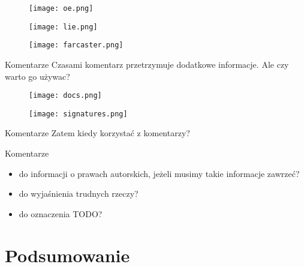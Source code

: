 \begin{frame}
	\begin{figure} \centering
		\texttt{[image: oe.png]}
	\end{figure}
\end{frame}

\begin{frame}
	\begin{figure} \centering
		\texttt{[image: lie.png]}
	\end{figure}
\end{frame}

\begin{frame}
	\begin{figure} \centering
		\texttt{[image: farcaster.png]}
	\end{figure}
\end{frame}

\begin{frame}{Komentarze}
	Czasami komentarz przetrzymuje dodatkowe informacje. Ale czy warto go używac?
\end{frame}

\begin{frame}
	\begin{figure} \centering
		\texttt{[image: docs.png]}
	\end{figure}
\end{frame}

\begin{frame}
	\begin{figure} \centering
		\texttt{[image: signatures.png]}
	\end{figure}
\end{frame}

\begin{frame}{Komentarze}
	Zatem kiedy korzystać z komentarzy?
\end{frame}

\begin{frame}{Komentarze}
	\begin{itemize}
		\item do informacji o prawach autorskich, jeżeli musimy takie informacje zawrzeć?
		\item do wyjaśnienia trudnych rzeczy?
		\item do oznaczenia TODO?
	\end{itemize}
\end{frame}

\section{Podsumowanie}

